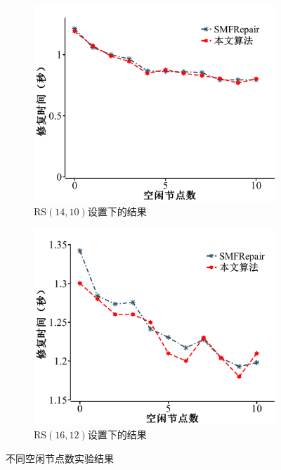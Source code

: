 \begin{figure}[htbp]
\begin{subfigure}[t]{0.4\textwidth}
		\centering
		\includegraphics[width=1\linewidth]{figures/3-17.pdf}
		\caption{RS$(14,10)$设置下的结果}
		\label{fig:3-17}
	\end{subfigure}
	\begin{subfigure}[t]{0.4\textwidth}
		\centering
		\includegraphics[width=1\linewidth]{figures/3-18.pdf}
		\caption{RS$(16,12)$设置下的结果}
		\label{fig:3-18}
	\end{subfigure}
	\caption{不同空闲节点数实验结果}
	\label{fig:3-15-18}
\end{figure}




